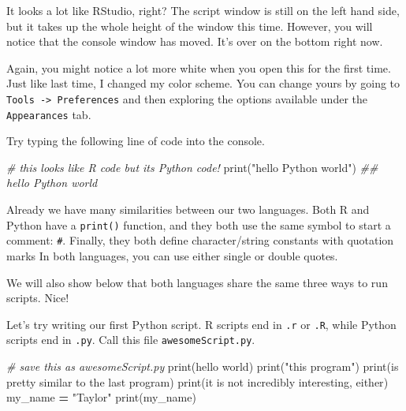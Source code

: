 \documentclass[
  12pt,
  krantz2]{krantz}
\makeatletter
\newenvironment{Shaded}{\begin{snugshade}}{\end{snugshade}}
\newcommand{\BuiltInTok}[1]{#1}
\newcommand{\CommentTok}[1]{\textcolor[rgb]{0.37,0.37,0.37}{\textit{#1}}}
\newcommand{\NormalTok}[1]{#1}
\newcommand{\OperatorTok}[1]{\textcolor[rgb]{0.43,0.43,0.43}{\textbf{#1}}}
\newcommand{\StringTok}[1]{\textcolor[rgb]{0.5,0.5,0.5}{#1}}
\newenvironment{kframe}{%
\medskip{}
\setlength{\fboxsep}{.8em}
 \def\at@end@of@kframe{}%
 \ifinner\ifhmode%
  \def\at@end@of@kframe{\end{minipage}}%
  \begin{minipage}{\columnwidth}%
 \fi\fi%
 \def\FrameCommand##1{\hskip\@totalleftmargin \hskip-\fboxsep
 \colorbox{shadecolor}{##1}\hskip-\fboxsep
     \hskip-\linewidth \hskip-\@totalleftmargin \hskip\columnwidth}%
 \MakeFramed {\advance\hsize-\width
   \@totalleftmargin\z@ \linewidth\hsize
   \@setminipage}}%
 {\par\unskip\endMakeFramed%
 \at@end@of@kframe}
\renewenvironment{Shaded}{\begin{kframe}}{\end{kframe}}
\makeatother
\begin{document}
It looks a lot like RStudio, right? The script window is still on the left hand side, but it takes up the whole height of the window this time. However, you will notice that the console window has moved. It's over on the bottom right now.

Again, you might notice a lot more white when you open this for the first time. Just like last time, I changed my color scheme. You can change yours by going to \texttt{Tools\ -\textgreater{}\ Preferences} and then exploring the options available under the \texttt{Appearances} tab.

Try typing the following line of code into the console.

\begin{Shaded}
\begin{Highlighting}[]
\CommentTok{\# this looks like R code but it\textquotesingle{}s Python code!}
\BuiltInTok{print}\NormalTok{(}\StringTok{"hello Python world"}\NormalTok{)}
\CommentTok{\#\# hello Python world}
\end{Highlighting}
\end{Shaded}

Already we have many similarities between our two languages. Both R and Python have a \texttt{print()} function, and they both use the same symbol to start a comment: \texttt{\#}. Finally, they both define character/string constants with quotation marks In both languages, you can use either single or double quotes.

We will also show below that both languages share the same three ways to run scripts. Nice!

Let's try writing our first Python script. R scripts end in \texttt{.r} or \texttt{.R}, while Python scripts end in \texttt{.py}. Call this file \texttt{awesomeScript.py}.

\begin{Shaded}
\begin{Highlighting}[]
\CommentTok{\# save this as awesomeScript.py}
\BuiltInTok{print}\NormalTok{(}\StringTok{\textquotesingle{}hello world\textquotesingle{}}\NormalTok{)}
\BuiltInTok{print}\NormalTok{(}\StringTok{"this program"}\NormalTok{)}
\BuiltInTok{print}\NormalTok{(}\StringTok{\textquotesingle{}is pretty similar to the last program\textquotesingle{}}\NormalTok{)}
\BuiltInTok{print}\NormalTok{(}\StringTok{\textquotesingle{}it is not incredibly interesting, either\textquotesingle{}}\NormalTok{)}
\NormalTok{my\_name }\OperatorTok{=} \StringTok{"Taylor"}
\BuiltInTok{print}\NormalTok{(my\_name)}
\end{Highlighting}
\end{Shaded}
\end{document}
